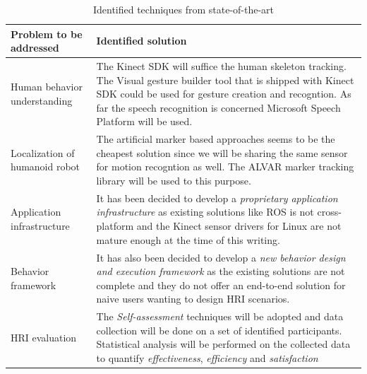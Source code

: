 \begin{table}[H]
\centering
\small
\caption{Identified techniques from state-of-the-art}
\label{table:review_decisions}
\begin{tabular}{ | l | p{10cm} |}
\hline
  \textbf{Problem to be addressed} & \textbf{Identified solution}
  \tabularnewline \hline
  
  Human behavior understanding & The Kinect SDK \cite{KinectSDK2014} will suffice the human skeleton tracking. The Visual gesture builder tool that is shipped with Kinect SDK could be used for gesture creation and recogntion. As far the speech recognition is concerned Microsoft Speech Platform \cite{SpeechSdk} will be used.
                                          \tabularnewline\hline
                                          
  Localization of humanoid robot & The artificial marker based approaches seems to be the cheapest solution since we will be sharing the same sensor for motion recogntion as well. The ALVAR marker tracking library \cite{ALVAR} will be used to this purpose. 
                                          \tabularnewline\hline
  
  Application infrastructure & It has been decided to develop a \emph{proprietary application infrastructure} as existing solutions like ROS \cite{quigley2009ros} is not cross-platform and the Kinect sensor drivers for Linux are not mature enough at the time of this writing.
                                          \tabularnewline\hline

  Behavior framework & It has also been decided to develop a \emph{new behavior design and execution framework} as the existing solutions are not complete and they do not offer an end-to-end solution for naive users wanting to design HRI scenarios.
                                          \tabularnewline\hline

  HRI evaluation & The \emph{Self-assessment} techniques will be adopted and data collection will be done on a set of identified participants. Statistical analysis will be performed on the collected data to quantify \emph{effectiveness}, \emph{efficiency} and \emph{satisfaction}
                                          \tabularnewline\hline
\end{tabular}
\end{table}